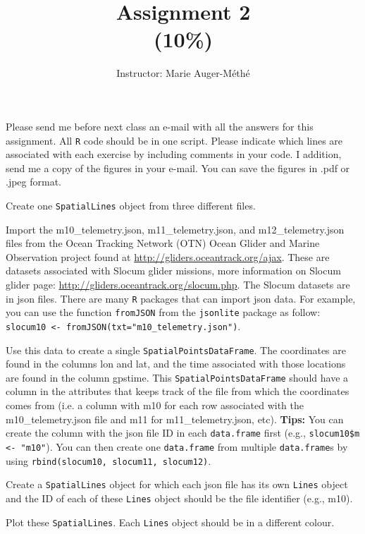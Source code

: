 \documentclass[11pt, oneside]{article}   	%
\title{Assignment 2 \\ \large(10\%)}
\author{Instructor: Marie Auger-M\'eth\'e}
\date{}							%
\begin{document}
\maketitle

Please send me before next class an e-mail with all the answers for this assignment. All \texttt{R} code should be in one script. Please indicate which lines are associated with each exercise by including comments in your code. I addition, send me a copy of the figures in your e-mail. You can save the figures in .pdf or .jpeg format.

\begin{Exercise}

Create one \texttt{SpatialLines} object from three different files.

\Question
Import the m10\_telemetry.json, m11\_telemetry.json, and m12\_telemetry.json files from the Ocean Tracking Network (OTN) Ocean Glider and Marine Observation project found at \url{http://gliders.oceantrack.org/ajax}. These are datasets associated with Slocum glider missions, more information on Slocum glider page: \url{http://gliders.oceantrack.org/slocum.php}. The Slocum datasets are in json files. There are many \texttt{R} packages that can import json data. For example, you can use the function \texttt{fromJSON} from the \texttt{jsonlite} package as follow: \texttt{slocum10 <- fromJSON(txt="m10\_telemetry.json")}.

\Question Use this data to create a single \texttt{SpatialPointsDataFrame}. The coordinates are found in the columns lon and lat, and the time associated with those locations are found in the column gpstime. This \texttt{SpatialPointsDataFrame} should have a column in the attributes that keeps track of the file from which the coordinates comes from (i.e. a column with m10 for each row associated with the m10\_telemetry.json file and m11 for m11\_telemetry.json, etc). \textbf{Tips:} You can create the column with the json file ID in each \texttt{data.frame} first (e.g., \texttt{slocum10\$m <- "m10"}). You can then create one \texttt{data.frame} from multiple \texttt{data.frame}s by using \texttt{rbind(slocum10, slocum11, slocum12)}. 

\Question Create a \texttt{SpatialLines} object for which each json file has its own \texttt{Lines} object and the ID of each of these \texttt{Lines} object should be the file identifier (e.g., m10). 

\Question Plot these \texttt{SpatialLines}. Each \texttt{Lines} object  should be in a different colour.

\end{Exercise}
\end{document}
